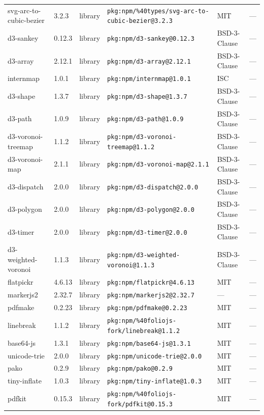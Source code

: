 \documentclass[11pt]{article}
\begin{document}
\begin{longtable}{|l|l|l|p{2.2cm}|l|p{4cm}|}
svg-arc-to-cubic-bezier & 3.2.3 & library & \texttt{pkg:npm/\%40types/svg-arc-to-cubic-bezier@3.2.3} & MIT & — \\
d3-sankey & 0.12.3 & library & \texttt{pkg:npm/d3-sankey@0.12.3} & BSD-3-Clause & — \\
d3-array & 2.12.1 & library & \texttt{pkg:npm/d3-array@2.12.1} & BSD-3-Clause & — \\
internmap & 1.0.1 & library & \texttt{pkg:npm/internmap@1.0.1} & ISC & — \\
d3-shape & 1.3.7 & library & \texttt{pkg:npm/d3-shape@1.3.7} & BSD-3-Clause & — \\
d3-path & 1.0.9 & library & \texttt{pkg:npm/d3-path@1.0.9} & BSD-3-Clause & — \\
d3-voronoi-treemap & 1.1.2 & library & \texttt{pkg:npm/d3-voronoi-treemap@1.1.2} & BSD-3-Clause & — \\
d3-voronoi-map & 2.1.1 & library & \texttt{pkg:npm/d3-voronoi-map@2.1.1} & BSD-3-Clause & — \\
d3-dispatch & 2.0.0 & library & \texttt{pkg:npm/d3-dispatch@2.0.0} & BSD-3-Clause & — \\
d3-polygon & 2.0.0 & library & \texttt{pkg:npm/d3-polygon@2.0.0} & BSD-3-Clause & — \\
d3-timer & 2.0.0 & library & \texttt{pkg:npm/d3-timer@2.0.0} & BSD-3-Clause & — \\
d3-weighted-voronoi & 1.1.3 & library & \texttt{pkg:npm/d3-weighted-voronoi@1.1.3} & BSD-3-Clause & — \\
flatpickr & 4.6.13 & library & \texttt{pkg:npm/flatpickr@4.6.13} & MIT & — \\
markerjs2 & 2.32.7 & library & \texttt{pkg:npm/markerjs2@2.32.7} & — & — \\
pdfmake & 0.2.23 & library & \texttt{pkg:npm/pdfmake@0.2.23} & MIT & — \\
linebreak & 1.1.2 & library & \texttt{pkg:npm/\%40foliojs-fork/linebreak@1.1.2} & MIT & — \\
base64-js & 1.3.1 & library & \texttt{pkg:npm/base64-js@1.3.1} & MIT & — \\
unicode-trie & 2.0.0 & library & \texttt{pkg:npm/unicode-trie@2.0.0} & MIT & — \\
pako & 0.2.9 & library & \texttt{pkg:npm/pako@0.2.9} & MIT & — \\
tiny-inflate & 1.0.3 & library & \texttt{pkg:npm/tiny-inflate@1.0.3} & MIT & — \\
pdfkit & 0.15.3 & library & \texttt{pkg:npm/\%40foliojs-fork/pdfkit@0.15.3} & MIT & — \\

\end{longtable}
\end{document}
